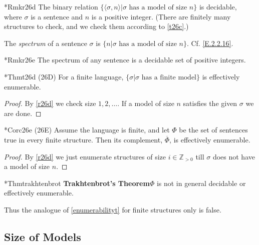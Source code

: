 \begin{reference}{*Rmk}{r26d}
  The binary relation $\{\langle \sigma,n\rangle|\sigma\text{ has a model of size }n\}$ is decidable, where $\sigma$ is a sentence and $n$ is a positive integer. (There are finitely many structures to check, and we check them according to \ref{t26c}.)
\end{reference}

The \textit{spectrum} of a sentence $\sigma$ is $\{n|\sigma\text{ has a model of size }n\}$. Cf. \ref{E.2.2.16}.

\begin{reference}{*Rmk}{r26e}
  The spectrum of any sentence is a decidable set of positive integers.
\end{reference}


\begin{reference}{*Thm}{t26d}
  (26D) For a finite language, $\{\sigma|\sigma\text{ has a finite model}\}$ is effectively enumerable.
\end{reference}

\begin{proof}
  By \ref{r26d} we check size $1,2,\dots$. If a model of size $n$ satisfies the given $\sigma$ we are done.
\end{proof}

\begin{reference}{*Cor}{c26e}
  (26E) Assume the language is finite, and let $\Phi$ be the set of sentences true in every finite structure. Then its complement, $\overline{\Phi}$, is effectively enumerable.
\end{reference}

\begin{proof}
  By \ref{r26d} we just enumerate structures of size $i\in\mathbb{Z}_{>0}$ till $\sigma$ does not have a model of size $n$.
\end{proof}

\begin{reference}{*Thm}{trakhtenbrot}
  \textbf{Trakhtenbrot's Theorem}\quad $\Phi$ is not in general decidable or effectively enumerable.
\end{reference}

Thus the analogue of \ref{enumerabilityt} for finite structures only is false.

\subsection*{Size of Models}

